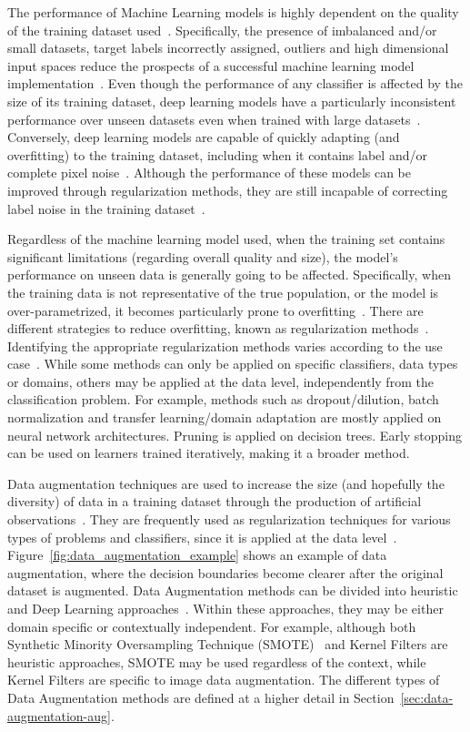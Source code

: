 The performance of Machine Learning models is highly dependent on the quality
of the training dataset used~\cite{Fenza2021, Halevy2009}. Specifically, the
presence of imbalanced and/or small datasets, target labels incorrectly
assigned, outliers and high dimensional input spaces reduce the prospects of a
successful machine learning model implementation~\cite{Halevy2009,
Domingos2012, Salman2019}.  Even though the performance of any classifier is
affected by the size of its training dataset, deep learning models have a
particularly inconsistent performance over unseen datasets even when trained
with large datasets~\cite{Hu2020, Xie2021}.  Conversely, deep learning models
are capable of quickly adapting (and overfitting) to the training dataset,
including when it contains label and/or complete pixel noise~\cite{Xie2021,
Zhang2021}.  Although the performance of these models can be improved through
regularization methods, they are still incapable of correcting label noise in
the training dataset~\cite{Zhang2021}.

Regardless of the machine learning model used, when the training set contains
significant limitations (regarding overall quality and size), the model's
performance on unseen data is generally going to be affected. Specifically,
when the training data is not representative of the true population, or the
model is over-parametrized, it becomes particularly prone to
overfitting~\cite{Bartlett2021}. There are different strategies to reduce
overfitting, known as regularization methods~\cite{Shorten2019}. Identifying
the appropriate regularization methods varies according to the use
case~\cite{Chun2020}. While some methods can only be applied on specific
classifiers, data types or domains, others may be applied at the data level,
independently from the classification problem. For example, methods such as
dropout/dilution, batch normalization and transfer learning/domain adaptation
are mostly applied on neural network architectures.  Pruning is applied on
decision trees. Early stopping can be used on learners trained iteratively,
making it a broader method. 

Data augmentation techniques are used to increase the size (and hopefully the
diversity) of data in a training dataset through the production of artificial
observations~\cite{Van2001, Wong2016}. They are frequently used as
regularization techniques for various types of problems and classifiers, since
it is applied at the data level~\cite{Behpour2019}.
Figure~\ref{fig:data_augmentation_example} shows an example of data
augmentation, where the decision boundaries become clearer after the original
dataset is augmented. Data Augmentation methods can be divided into heuristic
and Deep Learning approaches~\cite{Shorten2019, Ratner2017}. Within these
approaches, they may be either domain specific or contextually independent.
For example, although both Synthetic Minority Oversampling Technique
(SMOTE)~\cite{Chawla2002} and Kernel Filters are heuristic approaches, SMOTE
may be used regardless of the context, while Kernel Filters are specific to
image data augmentation. The different types of Data Augmentation methods are
defined at a higher detail in Section~\ref{sec:data-augmentation-aug}.

